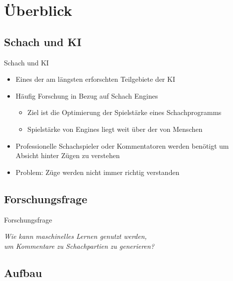 \section{Überblick}

\subsection{Schach und KI}

\begin{frame}{Schach und KI}
\begin{itemize}
	\item Eines der am längsten erforschten Teilgebiete der KI
	\item Häufig Forschung in Bezug auf Schach Engines
	\begin{itemize}
		\item Ziel ist die Optimierung der Spielstärke eines Schachprogramms
		\item Spielstärke von Engines liegt weit über der von Menschen
	\end{itemize}
	\item Professionelle Schachspieler oder Kommentatoren werden benötigt um Absicht hinter Zügen zu verstehen
	\item Problem: Züge werden nicht immer richtig verstanden
\end{itemize}
\end{frame}

\subsection{Forschungsfrage}

\begin{frame}{Forschungsfrage}
\begin{center}
\begin{large}
\textit{Wie kann maschinelles Lernen genutzt werden,\\um Kommentare zu Schachpartien zu generieren?}
\end{large}
\end{center}
\end{frame}

\subsection{Aufbau}

